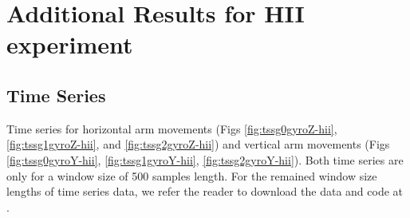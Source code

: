 \chapter{Additional Results for HII experiment} \label{appendix:d}


\graphicspath{{figs/appendixD/PDF/}}



\section{Time Series} \label{appendix:d:ts}
Time series for horizontal arm movements 
(Figs \ref{fig:tssg0gyroZ-hii}, 
\ref{fig:tssg1gyroZ-hii}, and \ref{fig:tssg2gyroZ-hii})
and vertical arm movements 
(Figs \ref{fig:tssg0gyroY-hii}, \ref{fig:tssg1gyroY-hii},
\ref{fig:tssg2gyroY-hii}).
Both time series are only for a window size of 500 samples length.
For the remained window size lengths of time series data, we refer
the reader to download the data and code at \cite{hwum2018}.
